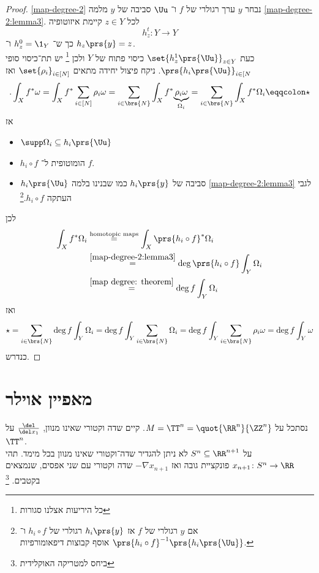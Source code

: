 \documentclass[a4paper,10pt,twoside,openany]{book}
\begin{document}
\begin{proof}\ref{map-degree-2}
נבחר
$y$
ערך רגולרי של
$f$
ו־%
$\Uu$
סביבה של
$y$
מלמה
\ref{map-degree-2:lemma3}.
לכל
$z \in Y$
קיימת איזוטופיה
\[h_z^t \colon Y \to Y\]
כך ש־%
$h_z^0 = \1_Y$
ו־%
$h_z\prs{y} = z$.\\
כעת
$\set{h^1_z\prs{\Uu}}_{z \in Y}$
כיסוי פתוח של
$Y$
ולכן%
\footnote{כל היריעות אצלנו סגורות}
יש תת־כיסוי סופי
$\prs{h_i\prs{\Uu}}_{i\in[N}$.
ניקח פיצול יחידה מתאים
$\set{\rho_i}_{i\in[N]}$
ואז
\begin{align*}
\text{.} \int_X f^* \omega = \int_X f^* \sum_{i \in [N]} \rho_i \omega = \sum_{i \in \brs{N}} \int_X f^* \underset{\Omega_i}{\underbrace{\rho_i \omega}} = \sum_{i \in \brs{N}} \int_X f^* \Omega_i \eqqcolon \star
\end{align*}
אז
\begin{itemize}
\item $\supp \Omega_i \subseteq h_i\prs{\Uu}$
\item $h_i \circ f$
הומוטופית ל־%
$f$.
\item $h_i\prs{\Uu}$
סביבה של
$h_i\prs{y}$
כמו שבנינו בלמה
\ref{map-degree-2:lemma3}
לגבי העתקה
$h_i \circ f$.\footnote{
אם
$y$
רגולרי של
$f$
אז
$h_i\prs{y}$
רגולרי של
$h_i \circ f$
ו־%
$\prs{h_i \circ f}^{-1} \prs{h_i \prs{\Uu}}$
אוסף קבוצות דיפאומורפיות.
}
\end{itemize}
לכן
\begin{align*}
\int_X f^* \Omega_i &\stackrel{\text{homotopic maps}}{=} \int_X \prs{h_i \circ f}^* \Omega_i \\&\stackrel{\ref{map-degree-2:lemma3}}{=}
\deg \prs{h_i \circ f} \int_Y \Omega_i \\&\stackrel{\ref{map degree: theorem}}{=}
\deg f \int_Y \Omega_i
\end{align*}
ואז
\begin{align*}
\star = \sum_{i \in \brs{N}} \deg f \int_Y \Omega_i = \deg f \int_Y \sum_{i\in\brs{N}} \Omega_i = \deg f \int_Y \sum_{i\in\brs{N}} \rho_i \omega = \deg f \int_Y \omega
\end{align*}
כנדרש.
\end{proof}

\chapter{מאפיין אוילר}

\begin{example}
נסתכל על
$M = \TT^n = \quot{\RR^n}{\ZZ^n}$.
קיים שדה וקטורי שאינו מנוון,
$\frac{\del}{\del x_1}$
על
$\TT^n$.\\
על
$S^n \subseteq \RR^{n+1}$
לא ניתן להגדיר שדה־וקטורי שאינו מנוון בכל מימד.
תהי
$x_{n+1} \colon S^n \to \RR$
פונקציית גובה ואז
$- \nabla x_{n+1}$
שדה וקטורי עם שני אפסים, שנמצאים בקטבים.%
\footnote{ביחס למטריקה האוקלידית}
\end{example}
\end{document}
